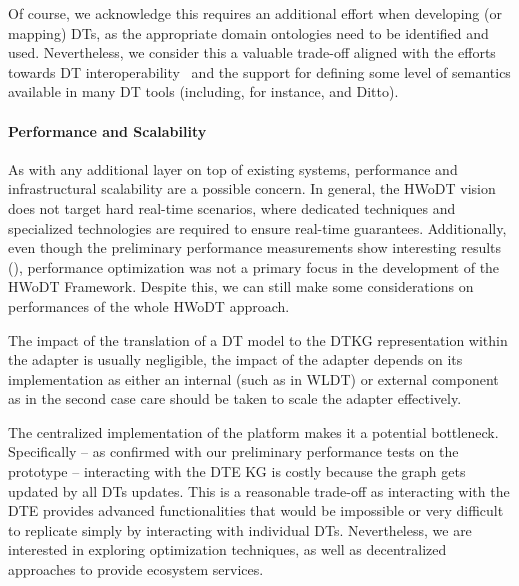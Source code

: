 Of course, we acknowledge this requires an additional effort when developing (or mapping) \acp{DT}, as the appropriate domain ontologies need to be identified and used.
Nevertheless, we consider this a valuable trade-off aligned with the efforts towards \ac{DT} interoperability~\cite{Klar_Arvidsson_Angelakis_2024} and the support for defining some level of semantics available in many \ac{DT} tools (including, for instance, \azureTwin{} and Ditto).



\paragraph{Performance and Scalability}

As with any additional layer on top of existing systems, performance and infrastructural scalability are a possible concern.
%
In general, the \ac{HWoDT} vision does not target hard real-time scenarios, where dedicated techniques and specialized technologies are required to ensure real-time guarantees.
%
Additionally, even though the preliminary performance measurements show interesting results (), performance optimization was not a primary focus in the development of the \ac{HWoDT} Framework. 
%
Despite this, we can still make some considerations on performances of the whole \ac{HWoDT} approach.

The impact of the translation of a \ac{DT} model to the \ac{DTKG} representation within the adapter is usually negligible, the impact of the adapter depends on its implementation as either an internal (such as in \ac{WLDT}) or external component as in the second case care should be taken to scale the adapter effectively.

The centralized implementation of the platform makes it a potential bottleneck. Specifically -- as confirmed with our preliminary performance tests on the prototype -- interacting with the \ac{DTE} KG is costly because the graph gets updated by all \acp{DT} updates.
%
This is a reasonable trade-off as interacting with the \ac{DTE} provides advanced functionalities that would be impossible or very difficult to replicate simply by interacting with individual \acp{DT}.
%
Nevertheless, we are interested in exploring optimization techniques, as well as decentralized approaches to provide ecosystem services.


